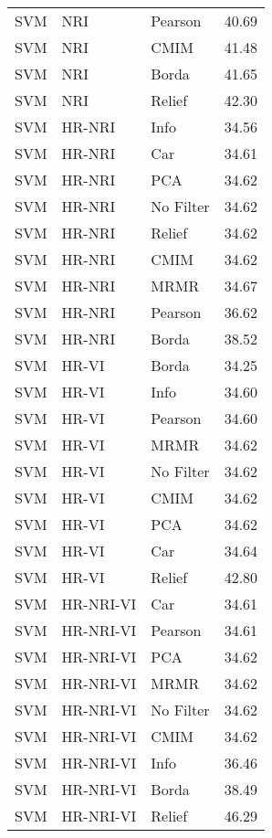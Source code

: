 \begin{longtable}{lllr}
  SVM & NRI & Pearson & 40.69 \\ 
  SVM & NRI & CMIM & 41.48 \\ 
  SVM & NRI & Borda & 41.65 \\ 
  SVM & NRI & Relief & 42.30 \\ 
  SVM & HR-NRI & Info & 34.56 \\ 
  SVM & HR-NRI & Car & 34.61 \\ 
  SVM & HR-NRI & PCA & 34.62 \\ 
  SVM & HR-NRI & No Filter & 34.62 \\ 
  SVM & HR-NRI & Relief & 34.62 \\ 
  SVM & HR-NRI & CMIM & 34.62 \\ 
  SVM & HR-NRI & MRMR & 34.67 \\ 
  SVM & HR-NRI & Pearson & 36.62 \\ 
  SVM & HR-NRI & Borda & 38.52 \\ 
  SVM & HR-VI & Borda & 34.25 \\ 
  SVM & HR-VI & Info & 34.60 \\ 
  SVM & HR-VI & Pearson & 34.60 \\ 
  SVM & HR-VI & MRMR & 34.62 \\ 
  SVM & HR-VI & No Filter & 34.62 \\ 
  SVM & HR-VI & CMIM & 34.62 \\ 
  SVM & HR-VI & PCA & 34.62 \\ 
  SVM & HR-VI & Car & 34.64 \\ 
  SVM & HR-VI & Relief & 42.80 \\ 
  SVM & HR-NRI-VI & Car & 34.61 \\ 
  SVM & HR-NRI-VI & Pearson & 34.61 \\ 
  SVM & HR-NRI-VI & PCA & 34.62 \\ 
  SVM & HR-NRI-VI & MRMR & 34.62 \\ 
  SVM & HR-NRI-VI & No Filter & 34.62 \\ 
  SVM & HR-NRI-VI & CMIM & 34.62 \\ 
  SVM & HR-NRI-VI & Info & 36.46 \\ 
  SVM & HR-NRI-VI & Borda & 38.49 \\ 
  SVM & HR-NRI-VI & Relief & 46.29 \\ 
   \bottomrule
\end{longtable}
